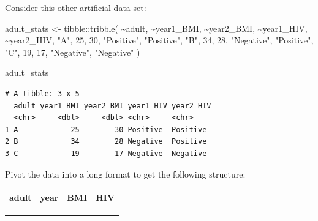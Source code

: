 \documentclass[
  letterpaper,
  DIV=11,
  numbers=noendperiod]{scrreprt}
\newenvironment{Shaded}{\begin{snugshade}}{\end{snugshade}}
\newcommand{\DecValTok}[1]{\textcolor[rgb]{0.68,0.00,0.00}{#1}}
\newcommand{\FunctionTok}[1]{\textcolor[rgb]{0.28,0.35,0.67}{#1}}
\newcommand{\NormalTok}[1]{\textcolor[rgb]{0.00,0.23,0.31}{#1}}
\newcommand{\OtherTok}[1]{\textcolor[rgb]{0.00,0.23,0.31}{#1}}
\newcommand{\SpecialCharTok}[1]{\textcolor[rgb]{0.37,0.37,0.37}{#1}}
\newcommand{\StringTok}[1]{\textcolor[rgb]{0.13,0.47,0.30}{#1}}
\begin{document}
\begin{tcolorbox}[enhanced jigsaw, colframe=quarto-callout-tip-color-frame, rightrule=.15mm, opacityback=0, breakable, coltitle=black, colbacktitle=quarto-callout-tip-color!10!white, bottomrule=.15mm, leftrule=.75mm, toprule=.15mm, arc=.35mm, bottomtitle=1mm, colback=white, left=2mm, opacitybacktitle=0.6, titlerule=0mm, title=\textcolor{quarto-callout-tip-color}{\faLightbulb}\hspace{0.5em}{Practice}, toptitle=1mm]

Consider this other artificial data set:

\begin{Shaded}
\begin{Highlighting}[]
\NormalTok{adult\_stats }\OtherTok{\textless{}{-}} 
\NormalTok{  tibble}\SpecialCharTok{::}\FunctionTok{tribble}\NormalTok{(}
    \SpecialCharTok{\textasciitilde{}}\NormalTok{adult,  }\SpecialCharTok{\textasciitilde{}}\NormalTok{year1\_BMI,  }\SpecialCharTok{\textasciitilde{}}\NormalTok{year2\_BMI,  }\SpecialCharTok{\textasciitilde{}}\NormalTok{year1\_HIV,  }\SpecialCharTok{\textasciitilde{}}\NormalTok{year2\_HIV,}
       \StringTok{"A"}\NormalTok{,          }\DecValTok{25}\NormalTok{,          }\DecValTok{30}\NormalTok{,  }\StringTok{"Positive"}\NormalTok{,  }\StringTok{"Positive"}\NormalTok{,}
       \StringTok{"B"}\NormalTok{,          }\DecValTok{34}\NormalTok{,          }\DecValTok{28}\NormalTok{,  }\StringTok{"Negative"}\NormalTok{,  }\StringTok{"Positive"}\NormalTok{,}
       \StringTok{"C"}\NormalTok{,          }\DecValTok{19}\NormalTok{,          }\DecValTok{17}\NormalTok{,  }\StringTok{"Negative"}\NormalTok{,  }\StringTok{"Negative"}
\NormalTok{  )}


\NormalTok{adult\_stats}
\end{Highlighting}
\end{Shaded}

\begin{verbatim}
# A tibble: 3 x 5
  adult year1_BMI year2_BMI year1_HIV year2_HIV
  <chr>     <dbl>     <dbl> <chr>     <chr>    
1 A            25        30 Positive  Positive 
2 B            34        28 Negative  Positive 
3 C            19        17 Negative  Negative 
\end{verbatim}

Pivot the data into a long format to get the following structure:

\begin{longtable}[]{@{}llll@{}}
\toprule\noalign{}
adult & year & BMI & HIV \\
\midrule\noalign{}
\endhead
\bottomrule\noalign{}
\endlastfoot
& & & \\
& & & \\
& & & \\
\end{longtable}


\end{tcolorbox}
\end{document}
